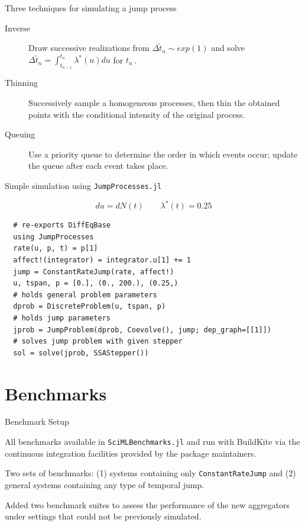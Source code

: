 \documentclass[
  ignorenonframetext,
  aspectratio=169,
  xcolor={dvipsnames,rgb}
]{beamer}
\begin{document}
\begin{frame}{Three techniques for simulating a jump process}

\begin{description}

  \item[Inverse] Draw successive realizations from \( \Delta \tilde{t}_n \sim exp(1) \) and solve \( \Delta \tilde{t}_n = \int_{t_{n-1}}^{t_n} \lambda^\ast (u) du \) for \( t_n \, \).

  \item[Thinning] Successively sample a homogeneous processes, then thin the obtained points with the conditional intensity of the original process.

  \item[Queuing] Use a priority queue to determine the order in which events occur; update the queue after each event takes place.

\end{description}

\end{frame}

\begin{frame}[fragile=singleslide]{Simple simulation using \texttt{JumpProcesses.jl}}

\[
  du = d N(t) \qquad \lambda^\ast (t) = 0.25
\]


\begin{lstlisting}
  # re-exports DiffEqBase
  using JumpProcesses
  rate(u, p, t) = p[1]
  affect!(integrator) = integrator.u[1] += 1
  jump = ConstantRateJump(rate, affect!)
  u, tspan, p = [0.], (0., 200.), (0.25,)
  # holds general problem parameters
  dprob = DiscreteProblem(u, tspan, p)
  # holds jump parameters
  jprob = JumpProblem(dprob, Coevolve(), jump; dep_graph=[[1]])
  # solves jump problem with given stepper
  sol = solve(jprob, SSAStepper())
\end{lstlisting}

\end{frame}

\hypertarget{benchmarks}{\section{Benchmarks}\label{benchmarks}}

\begin{frame}{Benchmark Setup}

All benchmarks available in \texttt{SciMLBenchmarks.jl} and run with BuildKite via the continuous integration facilities provided by the package maintainers.

\vspace{2em}

Two sets of benchmarks: (1) systems containing only \texttt{ConstantRateJump} and (2) general systems containing any type of temporal jump.

\vspace{2em}

Added two benchmark suites to assess the performance of the new aggregators under settings that could not be previously simulated.

\end{frame}
\end{document}
